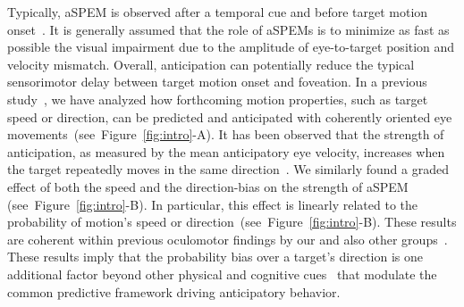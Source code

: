 \documentclass[12pt,english]{article}%
\newcommand{\citep}[1]{\parencite{#1}}
\newcommand{\seeFig}[1]{Figure~\ref{fig:#1}}
\begin{document}
Typically, aSPEM is observed after a temporal cue and
before target motion onset~\citep{Kowler1979a,Kowler1979b, Kowler1984}. %
It is generally assumed that the role of aSPEMs is
to minimize as fast as possible the visual impairment due
to the amplitude of eye-to-target position and velocity mismatch.
Overall, anticipation can potentially reduce the typical sensorimotor delay
between target motion onset and foveation. In a previous study~\citep{Montagnini2010},
we have analyzed how forthcoming motion properties,
such as target speed or direction, can be
predicted and anticipated with coherently oriented eye movements~(see~\seeFig{intro}-A).
It has been observed that the strength of anticipation,
as measured by the mean anticipatory eye velocity,
increases when the target repeatedly moves in the same direction~\citep{Kowler1984, Kowler1989, Heinen2005}.
We similarly found a graded effect of both the speed and the direction-bias
on the strength of aSPEM (see~\seeFig{intro}-B).
In particular, this effect is linearly related
to the probability of motion's speed or direction~(see~\seeFig{intro}-B).
These results are coherent within previous oculomotor findings
by our and also other groups~\citep{SantosKowler2017}.
These results imply that the probability bias over a target's direction is
one additional factor beyond other physical and cognitive cues~\citep{Kowler2014, SantosKowler2017,Damasse18}
that modulate the common predictive framework
driving anticipatory behavior.
%
\end{document}
